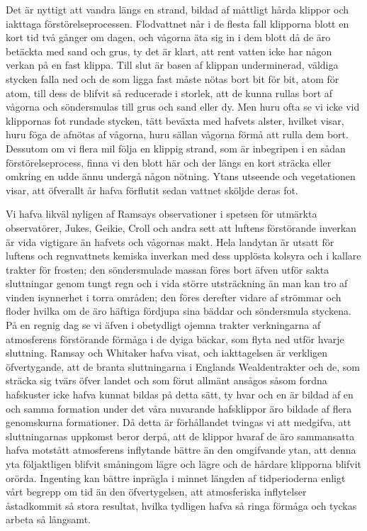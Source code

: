 Det är nyttigt att vandra längs en strand, bildad af måttligt hårda klippor och iakttaga förstörelseprocessen. Flodvattnet når i de flesta fall klipporna blott en kort tid två gånger om dagen, och vågorna äta sig in i dem blott då de äro betäckta med sand och grus, ty det är klart, att rent vatten icke har någon verkan på en fast klippa. Till slut är basen af klippan underminerad, väldiga stycken falla ned och de som ligga fast måste nötas bort bit för bit, atom för atom, till dess de blifvit så reducerade i storlek, att de kunna rullas bort af vågorna och söndersmulas till grus och sand eller dy. Men huru ofta se vi icke vid klippornas fot rundade stycken, tätt beväxta med hafvets alster, hvilket visar, huru föga de afnötas af vågorna, huru sällan vågorna förmå att rulla dem bort. Dessutom om vi flera mil följa en klippig strand, som är inbegripen i en sådan förstörelseprocess, finna vi den blott här och der längs en kort sträcka eller omkring en udde ännu undergå någon nötning. Ytans utseende och vegetationen visar, att öfverallt år hafva förflutit sedan vattnet sköljde deras fot.

Vi hafva likväl nyligen af Ramsays observationer i spetsen för utmärkta observatörer, Jukes, Geikie, Croll och andra sett att luftens förstörande inverkan är vida vigtigare än hafvets och vågornas makt. Hela landytan är utsatt för luftens och regnvattnets kemiska inverkan med dess upplösta kolsyra och i kallare trakter för frosten; den söndersmulade massan föres bort äfven utför sakta sluttningar genom tungt regn och i vida större utsträckning än man kan tro af vinden isynnerhet i torra områden; den föres derefter vidare af strömmar och floder hvilka om de äro häftiga fördjupa sina bäddar och söndersmula styckena. På en regnig dag se vi äfven i obetydligt ojemna trakter verkningarna af atmosferens förstörande förmåga i de dyiga bäckar, som flyta ned utför hvarje sluttning. Ramsay och Whitaker hafva visat, och iakttagelsen är verkligen öfvertygande, att de branta sluttningarna i Englands Wealdentrakter och de, som sträcka sig tvärs öfver landet och som förut allmänt ansågos såsom fordna hafskuster icke hafva kunnat bildas på detta sätt, ty hvar och en är bildad af en och samma formation under det våra nuvarande hafsklippor äro bildade af flera genomskurna formationer. Då detta är förhållandet tvingas vi att medgifva, att sluttningarnas uppkomst beror derpå, att de klippor hvaraf de äro sammansatta hafva motstått atmosferens inflytande bättre än den omgifvande ytan, att denna yta följaktligen blifvit småningom lägre och lägre och de hårdare klipporna blifvit orörda. Ingenting kan bättre inprägla i minnet längden af tidperioderna enligt vårt begrepp om tid än den öfvertygelsen, att atmosferiska inflytelser åstadkommit så stora resultat, hvilka tydligen hafva så ringa förmåga och tyckas arbeta så långsamt.

